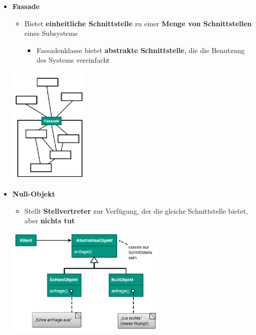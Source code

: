 \begin{itemize}
				\newpage
				\item \textbf{Fassade}
				\begin{itemize}
					\item Bietet \textbf{einheitliche Schnittstelle} zu einer \textbf{Menge von Schnittstellen} eines Subsystems
					\begin{itemize}
						\item Fassadenklasse bietet \textbf{abstrakte Schnittstelle}, die die Benutzung des Systems vereinfacht
					\end{itemize}
				\end{itemize}
				\begin{center}
					\includegraphics[width=0.3\textwidth]{../resources/images/fassadeSchichtenarchitektur.png}
				\end{center}
				\item \textbf{Null-Objekt}
				\begin{itemize}
					\item Stellt \textbf{Stellvertreter} zur Verfügung, der die gleiche Schnittstelle bietet, aber \textbf{nichts tut}
				\end{itemize}
				\begin{center}
					\includegraphics[width=0.6\textwidth]{../resources/images/nullObjekt.png}
				\end{center}
			\end{itemize}